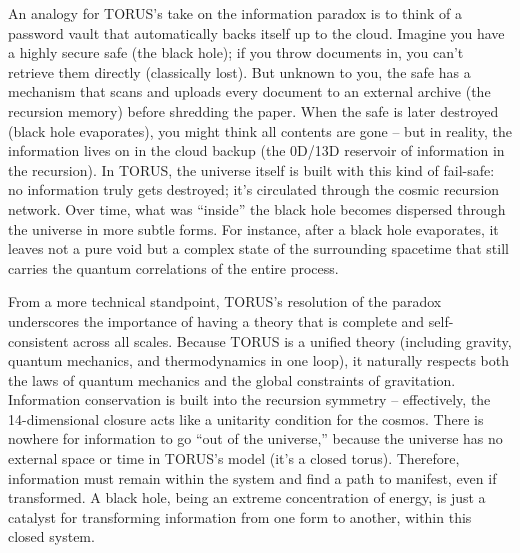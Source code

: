 \documentclass[
]{article}
\begin{document}
An analogy for TORUS's take on the information paradox is to think of a
password vault that automatically backs itself up to the cloud. Imagine
you have a highly secure safe (the black hole); if you throw documents
in, you can't retrieve them directly (classically lost). But unknown to
you, the safe has a mechanism that scans and uploads every document to
an external archive (the recursion memory) before shredding the paper.
When the safe is later destroyed (black hole evaporates), you might
think all contents are gone -- but in reality, the information lives on
in the cloud backup (the 0D/13D reservoir of information in the
recursion). In TORUS, the universe itself is built with this kind of
fail-safe: no information truly gets destroyed; it's circulated through
the cosmic recursion network. Over time, what was ``inside'' the black
hole becomes dispersed through the universe in more subtle forms. For
instance, after a black hole evaporates, it leaves not a pure void but a
complex state of the surrounding spacetime that still carries the
quantum correlations of the entire process.

From a more technical standpoint, TORUS's resolution of the paradox
underscores the importance of having a theory that is complete and
self-consistent across all scales. Because TORUS is a unified theory
(including gravity, quantum mechanics, and thermodynamics in one loop),
it naturally respects both the laws of quantum mechanics and the global
constraints of gravitation. Information conservation is built into the
recursion symmetry -- effectively, the 14-dimensional closure acts like
a unitarity condition for the cosmos. There is nowhere for information
to go ``out of the universe,'' because the universe has no external
space or time in TORUS's model (it's a closed torus). Therefore,
information must remain within the system and find a path to manifest,
even if transformed. A black hole, being an extreme concentration of
energy, is just a catalyst for transforming information from one form to
another, within this closed system.
\end{document}

